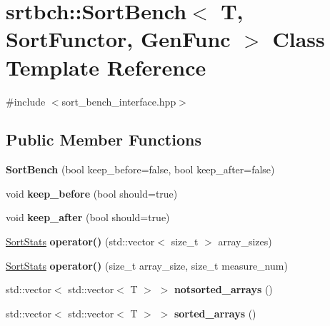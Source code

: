 \hypertarget{classsrtbch_1_1SortBench}{}\section{srtbch\+:\+:Sort\+Bench$<$ T, Sort\+Functor, Gen\+Func $>$ Class Template Reference}
\label{classsrtbch_1_1SortBench}


{\ttfamily \#include $<$sort\+\_\+bench\+\_\+interface.\+hpp$>$}

\subsection*{Public Member Functions}
\begin{DoxyCompactItemize}
\item 
\mbox{\label{classsrtbch_1_1SortBench_a52d335ca84bd9c41710c23a1f4f5a407}} 
{\bfseries Sort\+Bench} (bool keep\+\_\+before=false, bool keep\+\_\+after=false)
\item 
\mbox{\label{classsrtbch_1_1SortBench_a72c37a7e77d565ece01089ca1dbd0ac0}} 
void {\bfseries keep\+\_\+before} (bool should=true)
\item 
\mbox{\label{classsrtbch_1_1SortBench_af8f3d176e19a6c778eb9fedfeeeb8092}} 
void {\bfseries keep\+\_\+after} (bool should=true)
\item 
\mbox{\label{classsrtbch_1_1SortBench_a61a23df22267642e0b8b43547afeb9ed}} 
\hyperlink{sort__bench__interface_8hpp_afdb9897e91624a7b1e59809d240c3553}{Sort\+Stats} {\bfseries operator()} (std\+::vector$<$ size\+\_\+t $>$ array\+\_\+sizes)
\item 
\mbox{\label{classsrtbch_1_1SortBench_afa9ce928f5da5a8e9ffcedb563cff884}} 
\hyperlink{sort__bench__interface_8hpp_afdb9897e91624a7b1e59809d240c3553}{Sort\+Stats} {\bfseries operator()} (size\+\_\+t array\+\_\+size, size\+\_\+t measure\+\_\+num)
\item 
\mbox{\label{classsrtbch_1_1SortBench_a2c6df3b76eaa3dade395a893a388b272}} 
std\+::vector$<$ std\+::vector$<$ T $>$ $>$ {\bfseries notsorted\+\_\+arrays} ()
\item 
\mbox{\label{classsrtbch_1_1SortBench_abfd1290cc1fe9e19bb40c38cb8c08df2}} 
std\+::vector$<$ std\+::vector$<$ T $>$ $>$ {\bfseries sorted\+\_\+arrays} ()
\end{DoxyCompactItemize}


